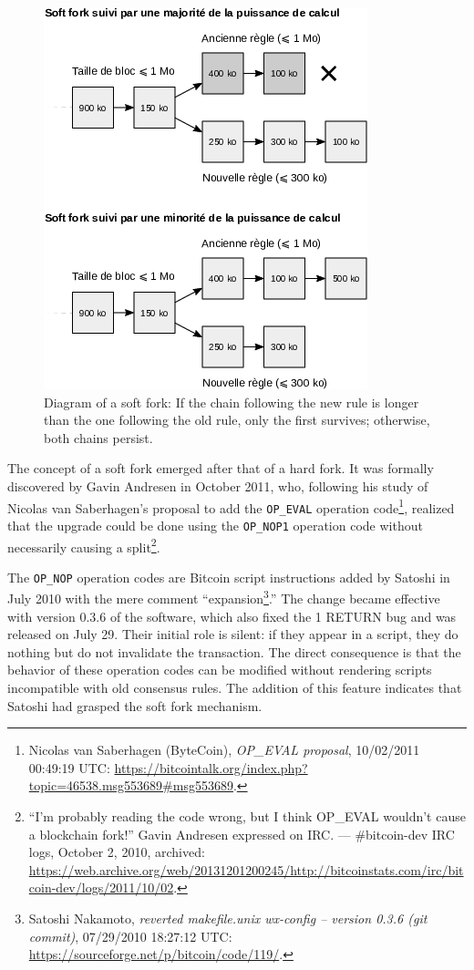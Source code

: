\documentclass[
  a5paper,
  smalldemyvopaper,10pt,twoside,onecolumn,openright,extrafontsizes,hidelinks]{memoir}
\begin{document}
\begin{figure}

{\centering \includegraphics{chapters/img/soft-fork-induced-forks.png}

}

\caption{Diagram of a soft fork: If the chain following the new rule is
longer than the one following the old rule, only the first survives;
otherwise, both chains persist.}

\end{figure}%

The concept of a soft fork emerged after that of a hard fork. It was
formally discovered by Gavin Andresen in October 2011, who, following
his study of Nicolas van Saberhagen's proposal to add the
\texttt{OP\_EVAL} operation code\footnote{Nicolas van Saberhagen
  (ByteCoin), \emph{OP\_EVAL proposal}, 10/02/2011 00:49:19 UTC:
  \url{https://bitcointalk.org/index.php?topic=46538.msg553689\#msg553689}.},
realized that the upgrade could be done using the \texttt{OP\_NOP1}
operation code without necessarily causing a split\footnote{``I'm
  probably reading the code wrong, but I think OP\_EVAL wouldn't cause a
  blockchain fork!'' Gavin Andresen expressed on IRC. --- \#bitcoin-dev
  IRC logs, October 2, 2010, archived:
  \url{https://web.archive.org/web/20131201200245/http://bitcoinstats.com/irc/bitcoin-dev/logs/2011/10/02}.}.

The \texttt{OP\_NOP} operation codes are Bitcoin script instructions
added by Satoshi in July 2010 with the mere comment
``expansion\footnote{Satoshi Nakamoto, \emph{reverted makefile.unix
  wx-config -- version 0.3.6 (git commit)}, 07/29/2010 18:27:12 UTC:
  \url{https://sourceforge.net/p/bitcoin/code/119/}.}.'' The change
became effective with version 0.3.6 of the software, which also fixed
the 1 RETURN bug and was released on July 29. Their initial role is
silent: if they appear in a script, they do nothing but do not
invalidate the transaction. The direct consequence is that the behavior
of these operation codes can be modified without rendering scripts
incompatible with old consensus rules. The addition of this feature
indicates that Satoshi had grasped the soft fork mechanism.
\end{document}
